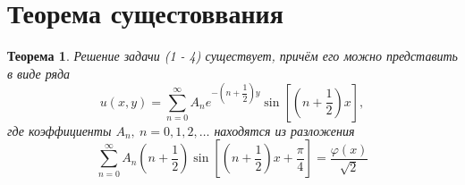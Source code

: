 \documentclass[a4paper, 11pt]{article}
\newtheorem{theorem}{Теорема}
\begin{document}
	\section{Теорема сущестоввания}
	\begin{theorem}
		Решение задачи (1 - 4) существует, причём его можно представить в виде ряда
		\begin{equation}
			u(x,y) = \sum\limits_{n=0}^{\infty} A_n e^{-\left(n + \dfrac12\right)y} \sin{\left[\left(n + \dfrac12\right)x\right]},
		\end{equation}
		где коэффициенты $A_n, \ n =0,1,2, \dots$ находятся из разложения
		\begin{equation}
			\sum\limits_{n=0}^{\infty} A_n \left(n + \dfrac12 \right) \sin{\left[\left(n +\dfrac12\right)x + \dfrac\pi4\right]} = \dfrac{\varphi(x)}{\sqrt2}
		\end{equation}
	\end{theorem}
	
\end{document}
